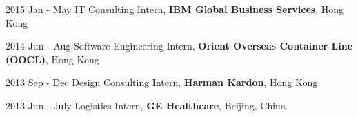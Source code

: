 
2015 Jan - May \hspace{10mm} 
IT Consulting Intern, \textbf{IBM Global Business Services}, Hong Kong

2014 Jun - Aug \hspace{10mm} 
Software Engineering Intern, \textbf{Orient Overseas Container Line (OOCL)}, Hong Kong

2013 Sep - Dec \hspace{9mm} 
Design Consulting Intern, \textbf{Harman Kardon}, Hong Kong

2013 Jun - July \hspace{10mm} 
Logistics Intern, \textbf{GE Healthcare}, Beijing, China
